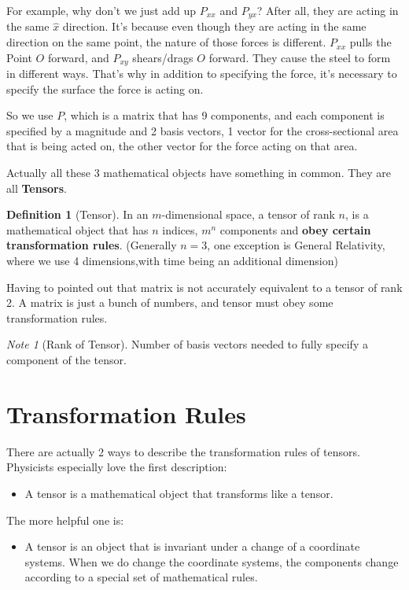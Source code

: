 \documentclass[UTF8]{ctexart}
\theoremstyle{definition}
\newtheorem{definition}{Definition}[section]
\theoremstyle{remark}
\newtheorem*{note}{Note}
\begin{document}
For example, why don't we just add up $ P_{xx} $ and $ P_{yx} $? After all, they are acting in the same $ \hat x $ direction.
It's because even though they are acting in the same direction on the same point, the nature of those forces is different. $ P_{xx} $ pulls the Point $ O $ forward, and $ P_{xy} $ shears/drags $O$ forward. They cause the steel to form in different ways. That's why in addition to specifying the force, it's necessary to specify the surface the force is acting on.

So we use $P$, which is a matrix that has 9 components, and each component is specified by a magnitude and 2 basis vectors, 1 vector for the cross-sectional area that is being acted on,
the other vector for the force acting on that area.



Actually all these 3 mathematical objects have something in common. They are all \textbf{Tensors}.

\begin{definition}[Tensor]
  In an $m$-dimensional space, a tensor of rank $n$, is a mathematical object that has $n$ indices, $m^n$ components and \textbf{obey certain transformation rules}. (Generally $n = 3$, one exception is General Relativity, where we use 4 dimensions,with time being an additional dimension)
\end{definition}
Having to pointed out that matrix is not accurately equivalent to a tensor of rank 2. A matrix is just a bunch of numbers, and tensor must obey some transformation rules.
\begin{note}[Rank of Tensor]
  Number of basis vectors needed to fully specify a component of the tensor.
\end{note}


\section{Transformation Rules}
\label{sec:transformation_rules}
There are actually 2 ways to describe the transformation rules of tensors.
Physicists especially love the first description:
\begin{itemize}
  \item A tensor is a mathematical object that transforms like a tensor.
\end{itemize}
The more helpful one is:
\begin{itemize}
  \item A tensor is an object that is invariant under a change of a coordinate systems. When we do change the coordinate systems, the components change according to a special set of mathematical rules.
\end{itemize}
\end{document}
